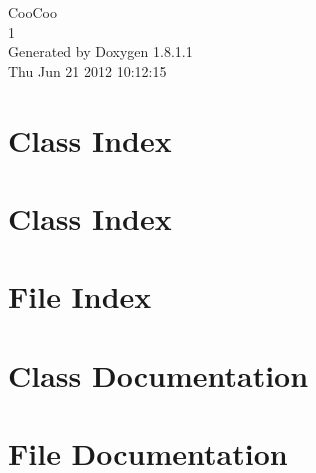 \documentclass{book}
\begin{document}
\hypersetup{pageanchor=false,citecolor=blue}
\begin{titlepage}
\vspace*{7cm}
\begin{center}
{\Large Coo\-Coo \\[1ex]\large 1 }\\
\vspace*{1cm}
{\large Generated by Doxygen 1.8.1.1}\\
\vspace*{0.5cm}
{\small Thu Jun 21 2012 10:12:15}\\
\end{center}
\end{titlepage}
\clearemptydoublepage
{}
\tableofcontents
\clearemptydoublepage
{}
\hypersetup{pageanchor=true,citecolor=blue}
\chapter{Class Index}

\chapter{Class Index}

\chapter{File Index}

\chapter{Class Documentation}














\chapter{File Documentation}












\printindex
\end{document}
